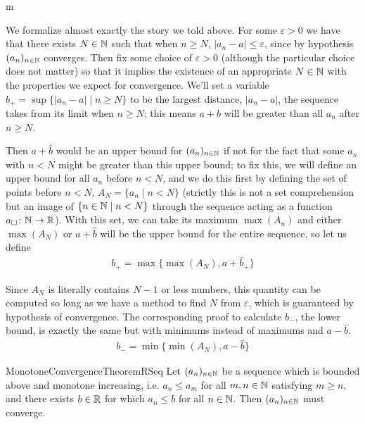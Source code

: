 \documentclass[11pt]{article}
\begin{document}
\begin{my proof}{m}

We formalize almost exactly the story we told above. For some $\varepsilon > 0$ we have that there exists $N \in \mathbb{N}$ such that when $n \ge N$, $|a_n - a| \le \varepsilon$, since by hypothesis $(a_n)_{n\in \mathbb{N}}$ converges. Then fix some choice of $\varepsilon > 0$ (although the particular choice does not matter) so that it implies the existence of an appropriate $N \in \mathbb{N}$ with the properties we expect for convergence. We'll set a variable $\hat{b}_+ = \sup\{|a_n - a| \mid n \ge N \}$ to be the largest distance, $|a_n - a|$, the sequence takes from its limit when $n \ge N$; this means $a + \hat{b}$ will be greater than all $a_n$ after $n \ge N$.

Then $a+\hat{b}$ would be an upper bound for $(a_n)_{n\in \mathbb{N}}$ if not for the fact that some $a_n$ with $n < N$ might be greater than this upper bound; to fix this, we will define an upper bound for all $a_n$ before $n < N$, and we do this first by defining the set of points before $n < N$, $A_N = \{a_n \mid n < N\}$ (strictly this is not a set comprehension but an image of $\{n \in \mathbb{N} \mid n < N\}$ through the sequence acting as a function $a_\square \colon \mathbb{N} \to \mathbb{R}$). With this set, we can take its maximum $\max(A_n)$ and either $\max(A_N)$ or $a+\hat{b}$ will be the upper bound for the entire sequence, so let us define \begin{gather*}
b_+ = \max \big\{ \max(A_N), a+ \hat{b}_+ \big\}
\end{gather*}

Since $A_N$ is literally contains $N - 1$ or less numbers, this quantity can be computed so long as we have a method to find $N$ from $\varepsilon$, which is guaranteed by hypothesis of convergence. The corresponding proof to calculate $b_-$, the lower bound, is exactly the same but with minimums instead of maximums and $a - \hat{b}$. \begin{gather*}
b_- = \min \big\{ \min(A_N), a - \hat{b} \big\}
\end{gather*}
\end{my proof}

\begin{label theorem}{MonotoneConvergenceTheoremRSeq}
Let $(a_n)_{n\in \mathbb{N}}$ be a sequence which is bounded above and monotone increasing, i.e. $a_n \le a_{m}$ for all $m,n  \in \mathbb{N}$ satisfying $m \ge n$, and there exists $b\in \mathbb{R}$ for which $a_n \le b$ for all $n \in \mathbb{N}$. Then $(a_n)_{n\in \mathbb{N}}$ must converge.
\end{label theorem}
\end{document}
